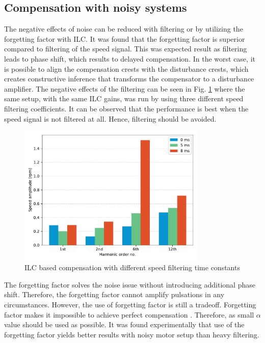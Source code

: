\subsection{Compensation with noisy systems}
The negative effects of noise can be reduced with filtering or by utilizing the forgetting factor with ILC. It was found that the forgetting factor is superior compared to filtering of the speed signal. This was expected result as filtering leads to phase shift, which results to delayed compensation. In the worst case, it is possible to align the compensation crests with the disturbance crests, which creates constructive inference that transforms the compensator to a disturbance amplifier. The negative effects of the filtering can be seen in Fig. \ref{Fig:ILC-filtering} where the same setup, with the same ILC gains, was run by using three different speed filtering coefficients. It can be observed that the performance is best when the speed signal is not filtered at all. Hence, filtering should be avoided. 
\begin{figure}[htb] 
    \centering
    \includegraphics[width=0.8\textwidth]{images/ILC-speed-filters.pdf}
    \caption{ILC based compensation with different speed filtering time constants}
    \label{Fig:ILC-filtering} 
\end{figure}
The forgetting factor solves the noise issue without introducing additional phase shift. Therefore, the forgetting factor cannot amplify pulsations in any circumstances. However, the use of forgetting factor is still a tradeoff. Forgetting factor makes it impossible to achieve perfect compensation \cite{ILC:2004, ILC:2005}. Therefore, as small $\alpha$ value should be used as possible. It was found experimentally that use of the forgetting factor yields better results with noisy motor setup than heavy filtering.


